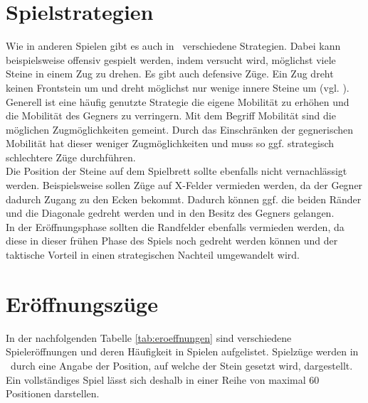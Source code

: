 \section{Spielstrategien}
\label{strat1}
Wie in anderen Spielen gibt es auch in \ot\ verschiedene Strategien. Dabei kann beispielsweise offensiv gespielt werden, indem versucht wird, möglichst viele Steine in einem Zug zu drehen. Es gibt auch defensive  Züge. Ein  Zug dreht keinen Frontstein um und dreht möglichst nur wenige innere Steine um (vgl. \cite{Ortiz.}).
\\ Generell ist eine häufig genutzte Strategie die eigene Mobilität zu erhöhen und die Mobilität des Gegners zu verringern. Mit dem Begriff Mobilität sind die möglichen Zugmöglichkeiten gemeint. Durch das Einschränken der gegnerischen Mobilität hat dieser weniger Zugmöglichkeiten und muss so ggf. strategisch schlechtere Züge durchführen.
\\Die Position der Steine auf dem Spielbrett sollte ebenfalls nicht vernachlässigt werden.
Beispielsweise sollen Züge auf X-Felder vermieden werden, da der Gegner dadurch Zugang zu den Ecken bekommt. Dadurch können ggf. die beiden Ränder und die Diagonale gedreht werden und in den Besitz des Gegners gelangen.
\\In der Eröffnungsphase sollten die Randfelder ebenfalls vermieden werden, da diese in dieser frühen Phase des Spiels noch gedreht werden können und der taktische Vorteil in einen strategischen Nachteil umgewandelt wird.
\section{Eröffnungszüge}
\label{othello-eroff}
In der nachfolgenden Tabelle \ref{tab:eroeffnungen} sind verschiedene Spieleröffnungen und deren Häufigkeit in Spielen aufgelistet. Spielzüge werden in \ot\ durch eine Angabe der Position, auf welche der Stein gesetzt wird, dargestellt. Ein vollständiges Spiel lässt sich deshalb in einer Reihe von maximal 60 Positionen darstellen.

